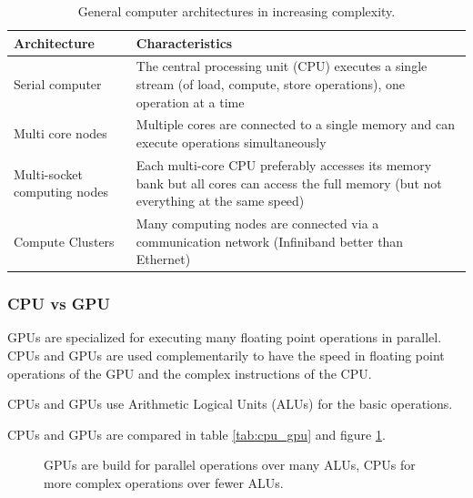 \begin{table}
    \centering
    \begin{tabular}{|p{}|p{}|}
        \hline
        \textbf{Architecture} & \textbf{Characteristics} \\
        \hline
        Serial computer & The central processing unit (CPU) executes a single stream (of load, compute, store operations), one operation at a time \\
        \hline
        Multi core nodes & Multiple cores are connected to a single memory and can execute operations simultaneously \\
        \hline
        Multi-socket computing nodes & Each multi-core CPU preferably accesses its memory bank but all cores can access the full memory (but not everything at the same speed) \\
        \hline
        Compute Clusters & Many computing nodes are connected via a communication network (Infiniband better than Ethernet) \\
        \hline
    \end{tabular}
    \caption{General computer architectures in increasing complexity.}
    \label{tab:architectures}
\end{table}

\subsubsection{CPU vs GPU}
GPUs are specialized for executing many floating point operations in parallel. CPUs and GPUs
are used complementarily to have the speed in floating point operations of the GPU and the
complex instructions of the CPU.

CPUs and GPUs use Arithmetic Logical Units (ALUs) for the basic operations.

CPUs and GPUs are compared in table \ref{tab:cpu_gpu} and figure \ref{fig:cpu_gpu}.

\begin{figure}
    \centering
    
    \caption{GPUs are build for parallel operations over many ALUs, CPUs for more complex operations over fewer ALUs.}
    \label{fig:cpu_gpu}
\end{figure}

